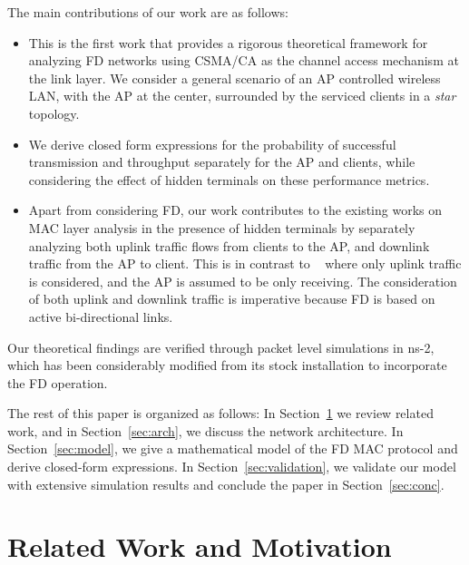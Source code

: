 \documentclass[10pt,journal,cspaper,compsoc]{IEEEtran}
\begin{document}
 The main contributions of our work are as follows:
 \begin{itemize}
 \item This is the first work that provides a rigorous theoretical framework for analyzing FD networks using CSMA/CA as the channel access mechanism at the link layer. We consider a general scenario of an AP controlled wireless LAN, with the AP at the center, surrounded by the serviced clients in a \textit{star} topology. 
 \item  We derive closed form expressions for the probability of successful transmission and throughput separately for the AP and clients, while considering the effect of hidden terminals on these performance metrics.  

\item Apart from considering FD, our work contributes to the existing works on MAC layer analysis in the presence of hidden terminals by separately analyzing both uplink traffic flows from clients to the AP, and downlink traffic from the AP to client. This is in contrast to ~\cite{Hung10,Tsertou08,Wu06,Liu10} where only uplink traffic is considered, and the AP is assumed to be only receiving. The consideration of both uplink and downlink traffic is imperative because FD is based on active bi-directional links.
\end{itemize}

Our theoretical findings are verified through packet level simulations in ns-2, which has been considerably modified from its stock installation to incorporate the FD operation.

The rest of this paper is organized as follows: In Section~\ref{sec:related} we review related work, and in Section~\ref{sec:arch}, we discuss the network architecture. In Section~\ref{sec:model}, we give a mathematical model of the FD MAC protocol and derive closed-form expressions. In Section~\ref{sec:validation}, we validate our model with extensive simulation results and conclude the paper in Section~\ref{sec:conc}.





\section{Related Work and Motivation}
\label{sec:related}
\end{document}
